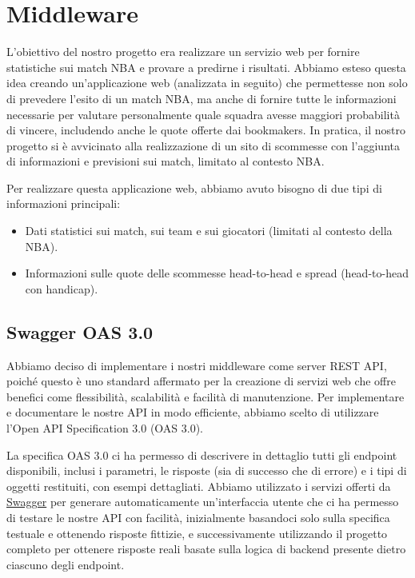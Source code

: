 \section{Middleware}

L'obiettivo del nostro progetto era realizzare un servizio web per fornire statistiche sui match NBA e provare a predirne i risultati. Abbiamo esteso questa idea creando un'applicazione web (analizzata in seguito) che permettesse non solo di prevedere l'esito di un match NBA, ma anche di fornire tutte le informazioni necessarie per valutare personalmente quale squadra avesse maggiori probabilità di vincere, includendo anche le quote offerte dai bookmakers. In pratica, il nostro progetto si è avvicinato alla realizzazione di un sito di scommesse con l'aggiunta di informazioni e previsioni sui match, limitato al contesto NBA.

Per realizzare questa applicazione web, abbiamo avuto bisogno di due tipi di informazioni principali:
\begin{itemize}
    \item Dati statistici sui match, sui team e sui giocatori (limitati al contesto della NBA).
    \item Informazioni sulle quote delle scommesse head-to-head e spread (head-to-head con handicap).
\end{itemize}

\subsection{Swagger OAS 3.0}

Abbiamo deciso di implementare i nostri middleware come server REST API, poiché questo è uno standard affermato per la creazione di servizi web che offre benefici come flessibilità, scalabilità e facilità di manutenzione. Per implementare e documentare le nostre API in modo efficiente, abbiamo scelto di utilizzare l'Open API Specification 3.0 (OAS 3.0).

La specifica OAS 3.0 ci ha permesso di descrivere in dettaglio tutti gli endpoint disponibili, inclusi i parametri, le risposte (sia di successo che di errore) e i tipi di oggetti restituiti, con esempi dettagliati. Abbiamo utilizzato i servizi offerti da \href{https://editor.swagger.io/}{Swagger} per generare automaticamente un'interfaccia utente che ci ha permesso di testare le nostre API con facilità, inizialmente basandoci solo sulla specifica testuale e ottenendo risposte fittizie, e successivamente utilizzando il progetto completo per ottenere risposte reali basate sulla logica di backend presente dietro ciascuno degli endpoint.

